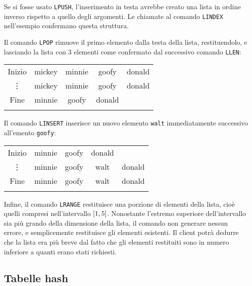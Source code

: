 Se si fosse usato \verb|LPUSH|, l'inserimento in testa avrebbe creato una lista in ordine inverso
rispetto a quello degli argomenti. Le chiamate al comando \verb|LINDEX| nell'esempio confermano
questa struttura.

Il comando \verb|LPOP|  rimuove il primo elemento dalla testa della lista, restituendolo,
e lasciando la lista con 3 elementi come confermato dal successivo comando \verb|LLEN|:

\begin{center}
	\begin{tabular}{c|*{4}{c|}}
	  \hhline{~----}
	  \scriptsize Inizio & mickey & minnie & goofy & donald \\ 
	  \hhline{~----}
	  \vdots             & \cellcolor{red!35}mickey & minnie & goofy & donald \\ 
	  \hhline{~----}
	  \scriptsize Fine   & minnie & goofy & donald \\ 
	  \hhline{~---}
	\end{tabular}
\end{center}

Il comando \verb|LINSERT|  inserisce un nuovo elemento \verb|walt| immediatamente
successivo all'emento \verb|goofy|:

\begin{center}
	\begin{tabular}{c|*{4}{c|}}
	  \hhline{~---}
	  \scriptsize Inizio & minnie & goofy & donald \\ 
	  \hhline{~----}
	  \vdots             & minnie & goofy & \cellcolor{blue!25}walt & donald \\ 
	  \hhline{~----}
	  \scriptsize Fine   & minnie & goofy & walt & donald \\ 
	  \hhline{~----}
	\end{tabular}
\end{center}

Infine, il comando \verb|LRANGE|  restituisce una porzione di elementi della lista, cioè
quelli compresi nell'intervallo $\interval{1}{5}$. Nonostante l'estremo superiore dell'intervallo
sia più grando della dimensione della lista, il comando non generare nessun errore, e semplicemente
restituisce gli elementi esistenti. Il client potrà dedurre che la lista era più breve dal fatto
che gli elementi restituiti sono in numero inferiore a quanti erano stati richiesti.

\subsection{Tabelle hash}

